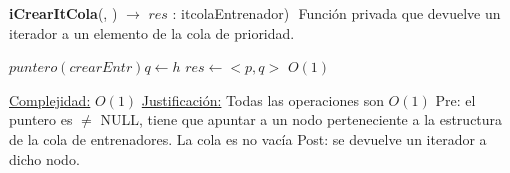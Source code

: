 \begin{Algoritmos}
\begin{algorithm}[H]{\textbf{iCrearItCola}(, ) $\to$ $res$ : itcolaEntrenador)} $ $\newline
\Comment Funci\'on privada que devuelve un iterador a un elemento de la cola de prioridad.
    	\begin{algorithmic}[1]
    		 \State $puntero(crearEntr) q \gets h$
			 \State $res \gets  <p, q> $ \Comment $O(1)$

			\medskip
			\Statex \underline{Complejidad:} $O(1)$
			\Statex \underline{Justificaci\'on:} Todas las operaciones son $O(1)$
			Pre: el puntero es $\not=$ NULL, tiene que apuntar a un nodo perteneciente a la estructura de la cola de entrenadores. La cola es no vac\'ia Post: se devuelve un iterador a dicho nodo.
    	\end{algorithmic}
\end{algorithm}


\end{Algoritmos}